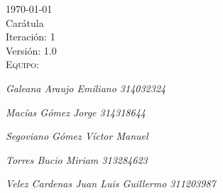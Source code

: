 \documentclass{article}
\begin{document}
\begin{titlepage}
\begin{center}
\begin{center}
         \end{center}
         \vspace{1mm} %
         \vspace{1mm} %
                {\huge \today}\\[1cm]
                \vspace{1mm} %
                       {\huge Carátula}\\[1cm]
                       \vspace{1mm} %
                              {\huge Iteración: 1}\\[1cm]
                              \vspace{1mm} %
                                     {\huge Versión: 1.0}\\[1cm]
                                     \vspace{1mm} %
                                            {\huge \scshape Equipo:}\\
                                            {\Large\itshape Galeana Araujo Emiliano 314032324\par}
                                            {\Large\itshape Macías Gómez Jorge 314318644\par}
                                            {\Large\itshape Segoviano Gómez Víctor Manuel\par}
                                            {\Large\itshape Torres Bucio Miriam 313284623\par}
                                            {\Large\itshape Velez Cardenas Juan Luis Guillermo 311203987\par}
                                            \vspace{3mm}


                                            \vspace{10mm} %

                                            \vfill %

  \end{center}
\end{titlepage}
\end{document}

